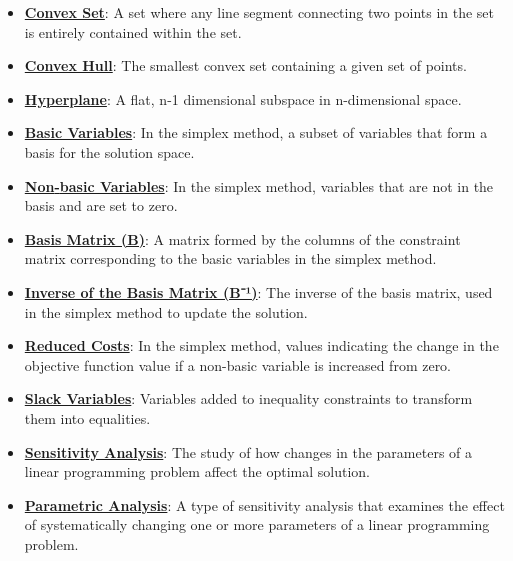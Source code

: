 \documentclass{article}%
\begin{document}
\begin{itemize}[leftmargin=*]
\item \href{https://www.math.purdue.edu/~yipn/421/2024-10-28-Farkas.pdf#page=4}{\textbf{Convex Set}}: A set where any line segment connecting two points in the set is entirely contained within the set. %
\item \href{https://www.math.purdue.edu/~yipn/421/2024-10-28-Farkas.pdf#page=4}{\textbf{Convex Hull}}: The smallest convex set containing a given set of points. %
\item \href{https://www.math.purdue.edu/~yipn/421/2024-10-28-Farkas.pdf#page=9}{\textbf{Hyperplane}}: A flat, n-1 dimensional subspace in n-dimensional space. %
\item \href{https://www.math.purdue.edu/~yipn/421/2024-10-28-Farkas.pdf#page=2}{\textbf{Basic Variables}}: In the simplex method, a subset of variables that form a basis for the solution space. %
\item \href{https://www.math.purdue.edu/~yipn/421/2024-10-28-Farkas.pdf#page=2}{\textbf{Non{-}basic Variables}}: In the simplex method, variables that are not in the basis and are set to zero. %
\item \href{https://www.math.purdue.edu/~yipn/421/2024-10-28-Farkas.pdf#page=7}{\textbf{Basis Matrix (B)}}: A matrix formed by the columns of the constraint matrix corresponding to the basic variables in the simplex method. %
\item \href{https://www.math.purdue.edu/~yipn/421/2024-10-28-Farkas.pdf#page=7}{\textbf{Inverse of the Basis Matrix (B⁻¹)}}: The inverse of the basis matrix, used in the simplex method to update the solution. %
\item \href{https://www.math.purdue.edu/~yipn/421/2024-10-28-Farkas.pdf#page=7}{\textbf{Reduced Costs}}: In the simplex method, values indicating the change in the objective function value if a non-basic variable is increased from zero. %
\item \href{https://www.math.purdue.edu/~yipn/421/2024-10-28-Farkas.pdf#page=2}{\textbf{Slack Variables}}: Variables added to inequality constraints to transform them into equalities. %
\item \href{https://www.math.purdue.edu/~yipn/421/2024-10-28-Farkas.pdf#page=1}{\textbf{Sensitivity Analysis}}: The study of how changes in the parameters of a linear programming problem affect the optimal solution. %
\item \href{https://www.math.purdue.edu/~yipn/421/2024-10-28-Farkas.pdf#page=4}{\textbf{Parametric Analysis}}: A type of sensitivity analysis that examines the effect of systematically changing one or more parameters of a linear programming problem. %

\end{itemize}
\end{document}
